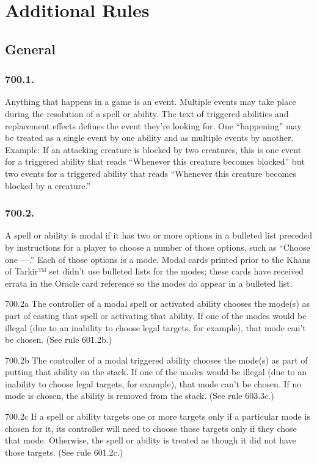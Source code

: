 \chapter{Additional Rules}
\setcounter{section}{699}
\section{General}
\subsection*{700.1.}
Anything that happens in a game is an event. Multiple events may take place during the resolution of a spell or ability. The text of triggered abilities and replacement effects defines the event they’re looking for. One “happening” may be treated as a single event by one ability and as multiple events by another.
Example: If an attacking creature is blocked by two creatures, this is one event for a triggered ability that reads “Whenever this creature becomes blocked” but two events for a triggered ability that reads “Whenever this creature becomes blocked by a creature.”

\subsection*{700.2.}
A spell or ability is modal if it has two or more options in a bulleted list preceded by instructions for a player to choose a number of those options, such as “Choose one —.” Each of those options is a mode. Modal cards printed prior to the Khans of Tarkir™ set didn’t use bulleted lists for the modes; these cards have received errata in the Oracle card reference so the modes do appear in a bulleted list.

700.2a The controller of a modal spell or activated ability chooses the mode(s) as part of casting that spell or activating that ability. If one of the modes would be illegal (due to an inability to choose legal targets, for example), that mode can’t be chosen. (See rule 601.2b.)

700.2b The controller of a modal triggered ability chooses the mode(s) as part of putting that ability on the stack. If one of the modes would be illegal (due to an inability to choose legal targets, for example), that mode can’t be chosen. If no mode is chosen, the ability is removed from the stack. (See rule 603.3c.)

700.2c If a spell or ability targets one or more targets only if a particular mode is chosen for it, its controller will need to choose those targets only if they chose that mode. Otherwise, the spell or ability is treated as though it did not have those targets. (See rule 601.2c.)

